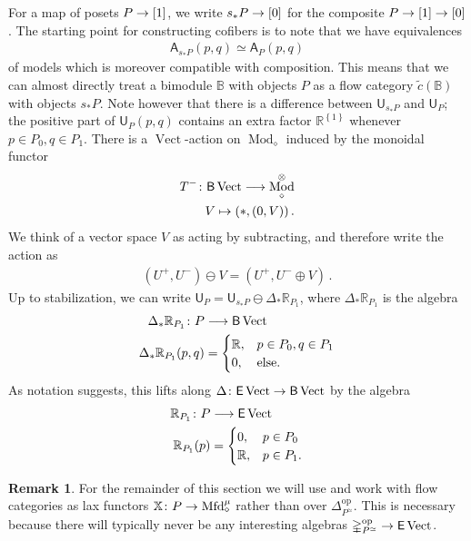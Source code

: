 \documentclass[10pt]{amsart}
\numberwithin{equation}{section}
\theoremstyle{definition}
\newtheorem{rem}[prop]{Remark}
\DeclareMathOperator{\Mod}{Mod}
\DeclareMathOperator{\op}{op}
\DeclareMathOperator{\Vect}{Vect}
\newcommand{\Mfd}{\mathrm{Mfd}\vphantom{d}}
\newcommand{\bB}{\mathbb{B}}
\newcommand{\bR}{\mathbb{R}}
\newcommand{\bX}{\mathbb{X}}
\newcommand{\Simp}{\mathbb{\Delta}}
\newcommand{\sfA}{\mathsf{A}}
\newcommand{\sfB}{\mathsf{B}}
\newcommand{\sfE}{\mathsf{E}}
\newcommand{\sfU}{\mathsf{U}}
\renewcommand{\to}{\mathchoice{\longrightarrow}{\rightarrow}{}{}}
\begin{document}
For a map of posets $P\to [1]$, we write $s_{*}P \to [0]$ for the composite $P\to [1] \to [0]$.
The starting point for constructing cofibers is to note that we have equivalences
\begin{align}\label{eq:A_sP=A_P}
	\sfA_{s_*P}(p,q) \simeq \sfA_{P}(p,q)
\end{align}
of models which is moreover compatible with composition.
This means that we can almost directly treat a bimodule $\bB$ with objects $P$ as a flow category $\tilde{c}(\bB)$ with objects $s_{*}P$.
Note however that there is a difference between $\sfU_{s_{*}P}$ and $\sfU_{P}$; the positive part of $\sfU_{P}(p,q)$ contains an extra factor $\bR^{ \left\{ 1\right\}}$ whenever $p\in P_{0},q\in P_{1}$.
There is a $\Vect$-action on $\Mod_{\diamond}$ induced by the monoidal functor
\begin{align*}
	T^{-}\colon \sfB \Vect \to \Mod_{\diamond}^{\otimes} \\
	V\mapsto (\ast, (0,V) ) \,.
\end{align*}
We think of a vector space $V$ as acting by subtracting, and therefore write the action as
\begin{align*}
	(U^{+},U^{-}) \ominus V = (U^{+},U^{-}\oplus V) \,.
\end{align*}
Up to stabilization, we can write $\sfU_{P} = \sfU_{s_{*}P } \ominus \Delta_{*}\bR_{P_{1}}$, where $\Delta_{*}\bR_{P_{1}}$ is the algebra
\begin{align*}
	\Delta_{*}\bR_{P_{1}} \colon P &\to \sfB \Vect \\
	\Delta_{*}\bR_{P_{1}}(p,q) &=\begin{cases}
		\bR, & p\in P_0, q\in P_1 \\
		0, & \text{else}.
	\end{cases}
\end{align*}
As notation suggests, this lifts along $\Delta\colon \sfE \Vect \to \sfB \Vect$ by the algebra
\begin{align*}
	\bR_{P_{1}} \colon P & \to \sfE \Vect \\
	\bR_{P_{1}}(p) &= \begin{cases}
		0, &  p\in P_{0} \\
		\bR, & p\in P_{1}.
	\end{cases}
\end{align*}
\begin{rem}
	For the remainder of this section we will use  and work with flow categories as lax functors $\bX \colon P \to \Mfd_{\diamond}^{\mu}$ rather than over $\Simp_{P^{\simeq}}^{\op}$.
  This is necessary because there will typically never be any interesting algebras $\Simp^{\op}_{P^{\simeq}} \to \sfE \Vect$.
\end{rem}
\end{document}
